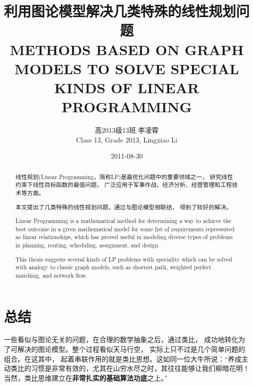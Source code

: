 \documentclass[a4paper]{article}
\date{2011-08-30}
\begin{document}
\title{利用图论模型解决几类特殊的线性规划问题 \\
METHODS BASED ON GRAPH MODELS TO SOLVE SPECIAL KINDS OF LINEAR PROGRAMMING}
\author{高2013级13班 李凌霄 \\
Class 13, Grade 2013, Lingxiao Li}
\maketitle
\begin{abstract}
	线性规划(Linear Programming，简称LP)是最优化问题中的重要领域之一，
	研究线性约束下线性目标函数的最值问题，
	广泛应用于军事作战、经济分析、经营管理和工程技术等方面。\par
	本文提出了几类特殊的线性规划问题，通过与图论模型相联结，
	得到了较好的解决。
	\par
	\vspace{0.6cm}
	Linear Programming is a mathematical method for determining a way
	to achieve the best outcome in a given mathematical model for some 
	list of requirements represented as linear relationships, 
	which has proved useful in modeling diverse types of problems in 
	planning, routing, scheduling, assignment, and design.\par
	This thesis suggests several kinds of LP problems with speciality
	which can be solved with analogy to classic graph models, 
	such as shortest path, weighted perfect matching, and network flow.
\end{abstract}
\tableofcontents






\section{总结}
一些看似与图论无关的问题，在合理的数学抽象之后，通过类比，
成功地转化为了可解决的图论模型。整个过程看似天马行空，
实际上只不过是几个简单问题的组合。在这其中，
起着串联作用的就是类比思想。这如同一位大牛所说：“养成主动类比的习惯是非常有效的，尤其在山穷水尽之时，其往往能够让我们柳暗花明！当然，类比思维建立在\textbf{非常扎实的基础算法功底}之上。”


\end{document}

